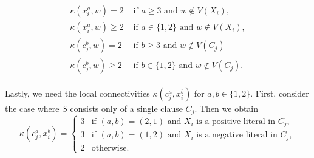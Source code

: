 \documentclass[letterpaper,12pt,headings=normal,parskip=half]{scrartcl}
\theoremstyle{definition}
\begin{document}
\begin{align}\label{eq:diffgadget}
\begin{split}
     \kappa(x_i^a,w)=2 &\text{ if } a\geq3 \text{ and } w\notin V(X_i),\\
     \kappa(x_i^a,w)\geq2 &\text{ if } a\in\{1,2\} \text{ and } w\notin V(X_i),\\
     \kappa(c_j^b,w)=2 &\text{ if } b\geq3 \text{ and } w\notin V(C_j)\\
     \kappa(c_j^b,w)\geq2 &\text{ if } b\in\{1,2\} \text{ and } w\notin V(C_j).
\end{split}
\end{align}

Lastly, we need the local connectivities $\kappa(c_j^a,x_i^b)$ for $a,b\in\{1,2\}$.
First, consider the case where $S$ consists only of a single clause $C_j$.
Then we obtain
\begin{equation}\label{eq:x-c-singleclause}
    \kappa(c_j^a,x_i^b)=\begin{cases}
        3 &\text{if } (a,b)=(2,1) \text{ and } X_i \text{ is a positive literal in } C_j,\\
        3 &\text{if } (a,b)=(1,2) \text{ and } X_i \text{ is a negative literal in } C_j,\\
        2 &\text{otherwise}.
    \end{cases}
\end{equation}
\end{document}

